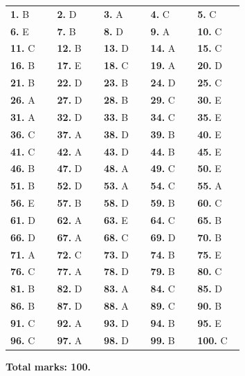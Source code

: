 \documentclass[10pt,a4paper,full]{physicsquiz}
\begin{document}
\begin{quizanswerkeycontent}
  \clearpage
  \begin{answerkey}
    \centering
    \renewcommand{\arraystretch}{1.25}
    \begin{tabular}{*{5}{>{\centering\arraybackslash}p{0.17\linewidth}}}
      \toprule
      \textbf{1.} B & \textbf{2.} D & \textbf{3.} A & \textbf{4.} C & \textbf{5.} C \\
      \textbf{6.} E & \textbf{7.} B & \textbf{8.} D & \textbf{9.} A & \textbf{10.} C \\
      \textbf{11.} C & \textbf{12.} B & \textbf{13.} D & \textbf{14.} A & \textbf{15.} C \\
      \textbf{16.} B & \textbf{17.} E & \textbf{18.} C & \textbf{19.} A & \textbf{20.} D \\
      \textbf{21.} B & \textbf{22.} D & \textbf{23.} B & \textbf{24.} D & \textbf{25.} C \\
      \textbf{26.} A & \textbf{27.} D & \textbf{28.} B & \textbf{29.} C & \textbf{30.} E \\
      \textbf{31.} A & \textbf{32.} D & \textbf{33.} B & \textbf{34.} C & \textbf{35.} E \\
      \textbf{36.} C & \textbf{37.} A & \textbf{38.} D & \textbf{39.} B & \textbf{40.} E \\
      \textbf{41.} C & \textbf{42.} A & \textbf{43.} D & \textbf{44.} B & \textbf{45.} E \\
      \textbf{46.} B & \textbf{47.} D & \textbf{48.} A & \textbf{49.} C & \textbf{50.} E \\
      \textbf{51.} B & \textbf{52.} D & \textbf{53.} A & \textbf{54.} C & \textbf{55.} A \\
      \textbf{56.} E & \textbf{57.} B & \textbf{58.} D & \textbf{59.} B & \textbf{60.} C \\
      \textbf{61.} D & \textbf{62.} A & \textbf{63.} E & \textbf{64.} C & \textbf{65.} B \\
      \textbf{66.} D & \textbf{67.} A & \textbf{68.} C & \textbf{69.} D & \textbf{70.} B \\
      \textbf{71.} A & \textbf{72.} C & \textbf{73.} D & \textbf{74.} B & \textbf{75.} E \\
      \textbf{76.} C & \textbf{77.} A & \textbf{78.} D & \textbf{79.} B & \textbf{80.} C \\
      \textbf{81.} B & \textbf{82.} D & \textbf{83.} A & \textbf{84.} C & \textbf{85.} D \\
      \textbf{86.} B & \textbf{87.} D & \textbf{88.} A & \textbf{89.} C & \textbf{90.} B \\
      \textbf{91.} C & \textbf{92.} A & \textbf{93.} D & \textbf{94.} B & \textbf{95.} E \\
      \textbf{96.} C & \textbf{97.} A & \textbf{98.} D & \textbf{99.} B & \textbf{100.} C \\
      \bottomrule
    \end{tabular}
    \medskip

    \textbf{Total marks: 100.}
  \end{answerkey}
\end{quizanswerkeycontent}
\end{document}
